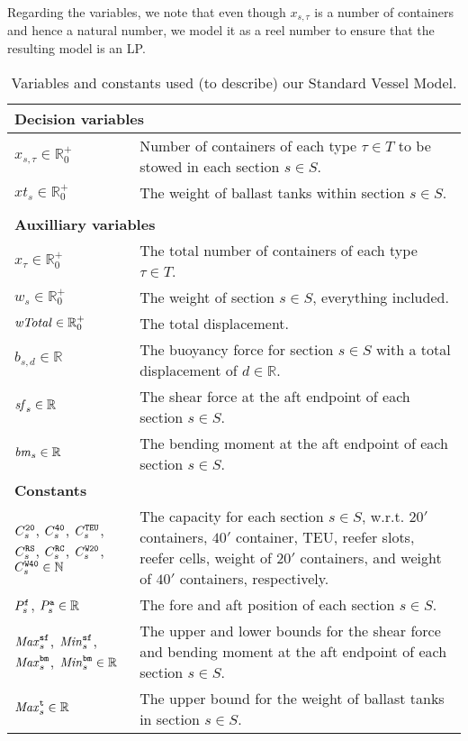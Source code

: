 Regarding the variables, we note that even though $x_{s,\tau}$ is a number of containers and hence a natural number, we model it as a reel number to ensure that the resulting model is an LP.  

\begin{table}
\centering
\begin{tabular}{p{3.5cm}p{9cm}}
\multicolumn{2}{l}{\textbf{Decision variables}}\\
\hline
$x_{s,\tau}\in \mathbb{R}^+_0$
		&Number of containers of each type $\tau\in T$ to be stowed in each section $s\in S$.\\
$xt_s\in \mathbb{R}^+_0$
		& The weight of ballast tanks within section $s\in S$.\\
\\
\multicolumn{2}{l}{\textbf{Auxilliary variables}}\\
\hline
$x_\tau\in \mathbb{R}^+_0$ & The total number of containers of each type $\tau\in T$.\\
$w_s\in \mathbb{R}^+_0$	& The weight of section $s\in S$, everything included.\\
$\mathit{wTotal}\in \mathbb{R}^+_0$	& The total displacement.\\
$b_{s,d} \in\mathbb{R}$ & The buoyancy force for section $s \in S$ with a total displacement of $d\in \mathbb{R}$.\\
$\mathit{sf}_s\in \mathbb{R}$ & The shear force at the aft endpoint of each section $s\in S$.\\
$\mathit{bm}_s\in \mathbb{R}$ & The bending moment at the aft endpoint of each section $s\in S$.\\
%
\multicolumn{2}{l}{\textbf{Constants}}\\
\hline\noalign{\smallskip}
$C_s^{\texttt{20}}$, $C_s^{\texttt{40}}$, $C_s^{\texttt{TEU}}$, $C_s^{\texttt{RS}}$, $C_s^{\texttt{RC}}$, 
$C_s^{\texttt{W20}}$, $C_s^{\texttt{W40}} \in \mathbb{N}$ & The capacity for each section $s\in S$, w.r.t. $20'$ containers, $40'$ container, TEU, reefer slots, reefer cells, weight of $20'$ containers, and weight of $40'$ containers, respectively.\\
%
$P^{\texttt{f}}_s$, $P^{\texttt{a}}_s \in \mathbb{R}$ & The fore and aft position of each section $s \in S$.\\  
$\mathit{Max}^{\texttt{sf}}_s$, $\mathit{Min}^{\texttt{sf}}_s$, $\mathit{Max}^{\texttt{bm}}_s$, $\mathit{Min}^{\texttt{bm}}_s \in \mathbb{R}$ & The upper and lower bounds for the shear force and bending moment at the aft endpoint of each section $s\in S$.\\
$\mathit{Max}^{\texttt{t}}_s\in \mathbb{R}$ & The upper bound for the weight of ballast tanks in section $s\in S$.\\
\end{tabular}
\caption{Variables and constants used (to describe) our Standard Vessel Model.}\label{table:constants}
\end{table}
%
